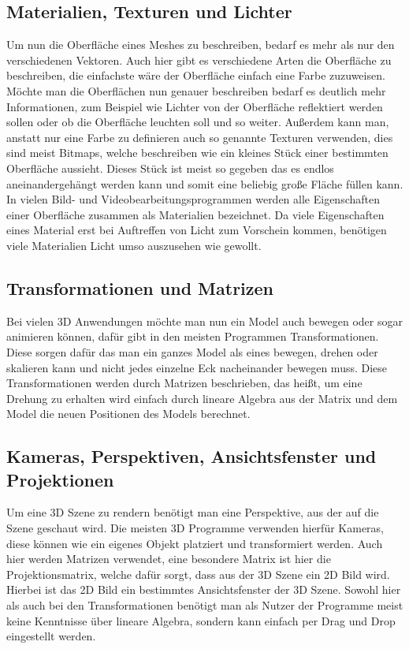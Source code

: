 \subsection{Materialien, Texturen und Lichter}
Um nun die Oberfläche eines Meshes zu beschreiben, bedarf es mehr als nur den verschiedenen Vektoren.
Auch hier gibt es verschiedene Arten die Oberfläche zu beschreiben, die einfachste wäre der Oberfläche einfach eine Farbe zuzuweisen.
Möchte man die Oberflächen nun genauer beschreiben bedarf es deutlich mehr Informationen, zum Beispiel wie Lichter von der Oberfläche reflektiert werden sollen oder ob die Oberfläche leuchten soll und so weiter.
Außerdem kann man, anstatt nur eine Farbe zu definieren auch so genannte Texturen verwenden, dies sind meist Bitmaps, welche beschreiben wie ein kleines Stück einer bestimmten Oberfläche aussieht.
Dieses Stück ist meist so gegeben das es endlos aneinandergehängt werden kann und somit eine beliebig große Fläche füllen kann.
In vielen Bild- und Videobearbeitungsprogrammen werden alle Eigenschaften einer Oberfläche zusammen als Materialien bezeichnet.
Da viele Eigenschaften eines Material erst bei Auftreffen von Licht zum Vorschein kommen, benötigen viele Materialien Licht umso auszusehen wie gewollt. \cite[5]{parisi2012webgl} 

\subsection{Transformationen und Matrizen}
Bei vielen 3D Anwendungen möchte man nun ein Model auch bewegen oder sogar animieren können, dafür gibt in den meisten Programmen Transformationen.
Diese sorgen dafür das man ein ganzes Model als eines bewegen, drehen oder skalieren kann und nicht jedes einzelne Eck nacheinander bewegen muss.
Diese Transformationen werden durch Matrizen beschrieben, das heißt, um eine Drehung zu erhalten wird einfach durch lineare Algebra aus der Matrix und dem Model die neuen Positionen des Models berechnet. \cite[6,7]{parisi2012webgl}

\subsection{Kameras, Perspektiven, Ansichtsfenster und Projektionen}
Um eine 3D Szene zu rendern benötigt man eine Perspektive, aus der auf die Szene geschaut wird.
Die meisten 3D Programme verwenden hierfür Kameras, diese können wie ein eigenes Objekt platziert und transformiert werden.
Auch hier werden Matrizen verwendet, eine besondere Matrix ist hier die Projektionsmatrix, welche dafür sorgt, dass aus der 3D Szene ein 2D Bild wird.
Hierbei ist das 2D Bild ein bestimmtes Ansichtsfenster der 3D Szene.
Sowohl hier als auch bei den Transformationen benötigt man als Nutzer der Programme meist keine Kenntnisse über lineare Algebra, sondern kann einfach per Drag und Drop eingestellt werden. \cite[7]{parisi2012webgl}

